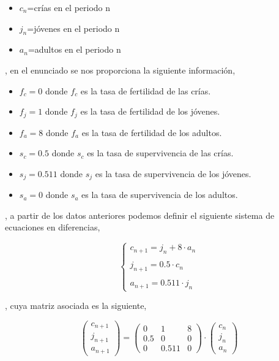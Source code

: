 \documentclass{article}
\begin{document}
\begin{itemize}
\item $c_n$=crías en el periodo n
\item $j_n$=jóvenes en el periodo n
\item $a_n$=adultos en el periodo n
\end{itemize}

, en el enunciado se nos proporciona la siguiente información,

\begin{itemize}
\item $f_c = 0$ donde $f_c$ es la tasa de fertilidad de las crías.
\item $f_j = 1$ donde $f_j$ es la tasa de fertilidad de los jóvenes.
\item $f_a = 8$ donde $f_a$ es la tasa de fertilidad de los adultos.
\item $s_c = 0.5$ donde $s_c$ es la tasa de supervivencia de las crías.
\item $s_j = 0.511$ donde $s_j$ es la tasa de supervivencia de los jóvenes.
\item $s_a = 0$ donde $s_a$ es la tasa de supervivencia de los adultos.
\end{itemize}

, a partir de los datos anteriores podemos definir el siguiente sistema de ecuaciones en diferencias,

\begin{equation*}
\left\{ \begin{array}{lcc}
             c_{n+1} = j_n + 8\cdot a_n \\
             \\ j_{n+1} = 0.5\cdot c_n \\
             \\ a_{n+1} = 0.511\cdot j_n
             \end{array}
   \right.
\end{equation*}

, cuya matriz asociada es la siguiente,

\begin{equation}
\begin{pmatrix}
c_{n+1} \\
j_{n+1} \\
a_{n+1}
\end{pmatrix} 
=
\begin{pmatrix}
0 & 1 & 8 \\
0.5 & 0 & 0 \\
0 & 0.511 & 0
\end{pmatrix}
\cdot
\begin{pmatrix}
c_n \\
j_n \\
a_n 
\end{pmatrix}
\end{equation}
\end{document}
